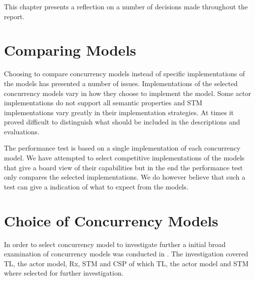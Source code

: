 \makeatletter {}\makeatother
{}
This chapter presents a reflection on a number of decisions made throughout the report.

\section{Comparing Models}
Choosing to compare concurrency models instead of specific implementations of the models has presented a number of issues. Implementations of the selected concurrency models vary in how they choose to implement the model. Some actor implementations do not support all semantic properties and \ac{STM} implementations vary greatly in their implementation strategies. At times it proved difficult to distinguish what should be included in the descriptions and evaluations. 

The performance test is based on a single implementation of each concurrency model. We have attempted to select competitive implementations of the models that give a board view of their capabilities but in the end the performance test only compares the selected implementations. We do however believe that such a test can give a indication of what to expect from the models.

\section{Choice of Concurrency Models}
In order to select concurrency model to investigate further a initial broad examination of concurrency models was conducted in . The investigation covered \ac{TL}, the actor model, \ac{Rx}, \ac{STM} and \ac{CSP} of which \ac{TL}, the actor model and \ac{STM} where selected for further investigation.

